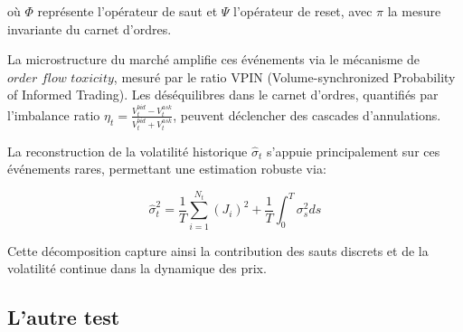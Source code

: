 \documentclass[12pt,a4paper]{article}
\theoremstyle{definition}
\theoremstyle{remark}
\begin{document}
où $\Phi$ représente l'opérateur de saut et $\Psi$ l'opérateur de reset, avec $\pi$ la mesure invariante du carnet d'ordres.

La microstructure du marché amplifie ces événements via le mécanisme de $\textit{order flow toxicity}$, mesuré par le ratio $\text{VPIN}$ (Volume-synchronized Probability of Informed Trading). Les déséquilibres dans le carnet d'ordres, quantifiés par l'imbalance ratio $\eta_t = \frac{V_t^{bid} - V_t^{ask}}{V_t^{bid} + V_t^{ask}}$, peuvent déclencher des cascades d'annulations.

La reconstruction de la volatilité historique $\hat{\sigma}_t$ s'appuie principalement sur ces événements rares, permettant une estimation robuste via:

\begin{equation}
\hat{\sigma}_t^2 = \frac{1}{T}\sum_{i=1}^{N_t} (J_i)^2 + \frac{1}{T}\int_0^T \sigma_s^2 ds
\end{equation}

Cette décomposition capture ainsi la contribution des sauts discrets et de la volatilité continue dans la dynamique des prix.




\subsection{L'autre test}
\end{document}
